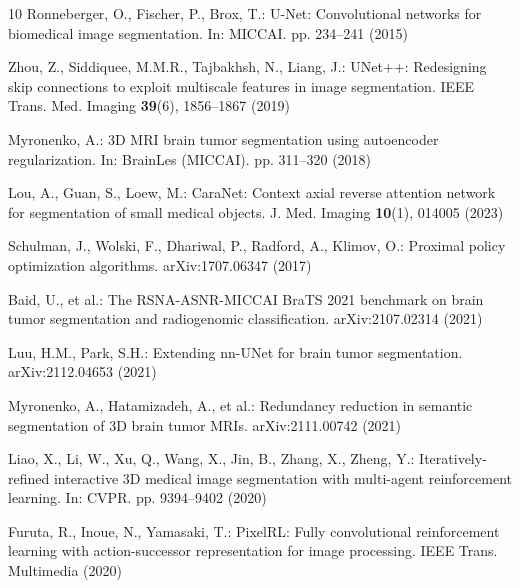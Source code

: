 \documentclass[runningheads]{llncs}
\begin{document}
\begin{thebibliography}{10}
Ronneberger, O., Fischer, P., Brox, T.: U-Net: Convolutional networks for biomedical image segmentation. In: MICCAI. pp. 234--241 (2015)

Zhou, Z., Siddiquee, M.M.R., Tajbakhsh, N., Liang, J.: UNet++: Redesigning skip connections to exploit multiscale features in image segmentation. IEEE Trans. Med. Imaging \textbf{39}(6), 1856--1867 (2019)

Myronenko, A.: 3D MRI brain tumor segmentation using autoencoder regularization. In: BrainLes (MICCAI). pp. 311--320 (2018)

Lou, A., Guan, S., Loew, M.: CaraNet: Context axial reverse attention network for segmentation of small medical objects. J. Med. Imaging \textbf{10}(1), 014005 (2023)

Schulman, J., Wolski, F., Dhariwal, P., Radford, A., Klimov, O.: Proximal policy optimization algorithms. arXiv:1707.06347 (2017)

Baid, U., et al.: The RSNA-ASNR-MICCAI BraTS 2021 benchmark on brain tumor segmentation and radiogenomic classification. arXiv:2107.02314 (2021)

Luu, H.M., Park, S.H.: Extending nn-UNet for brain tumor segmentation. arXiv:2112.04653 (2021)

Myronenko, A., Hatamizadeh, A., et al.: Redundancy reduction in semantic segmentation of 3D brain tumor MRIs. arXiv:2111.00742 (2021)

Liao, X., Li, W., Xu, Q., Wang, X., Jin, B., Zhang, X., Zheng, Y.: Iteratively-refined interactive 3D medical image segmentation with multi-agent reinforcement learning. In: CVPR. pp. 9394--9402 (2020)

Furuta, R., Inoue, N., Yamasaki, T.: PixelRL: Fully convolutional reinforcement learning with action-successor representation for image processing. IEEE Trans. Multimedia (2020)
\end{thebibliography}
\end{document}
